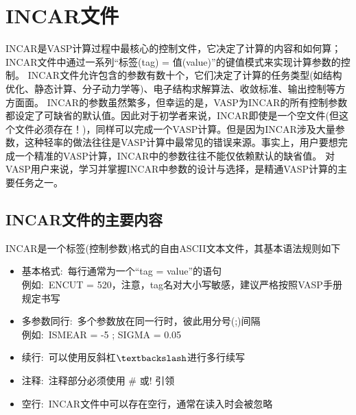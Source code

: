 \section{\rm{INCAR}文件}
\textrm{INCAR}是\textrm{VASP}计算过程中最核心的控制文件，它决定了计算的内容和如何算；\textrm{INCAR}文件中通过一系列``标签\textrm{(tag)} = 值\textrm{(value)}''的键值模式来实现计算参数的控制。
\textrm{INCAR}文件允许包含的参数有数十个，它们决定了计算的任务类型(如结构优化、静态计算、分子动力学等)、电子结构求解算法、收敛标准、输出控制等方方面面。
\textrm{INCAR}的参数虽然繁多，但幸运的是，\textrm{VASP}为\textrm{INCAR}的所有控制参数都设定了可缺省的默认值。因此对于初学者来说，\textrm{INCAR}即使是一个空文件(但这个文件必须存在！)，同样可以完成一个\textrm{VASP}计算。但是因为\textrm{INCAR}涉及大量参数，这种轻率的做法往往是\textrm{VASP}计算中最常见的错误来源。事实上，用户要想完成一个精准的\textrm{VASP}计算，\textrm{INCAR}中的参数往往不能仅依赖默认的缺省值。
对\textrm{VASP}用户来说，学习并掌握\textrm{INCAR}中参数的设计与选择，是精通\textrm{VASP}计算的主要任务之一。

\subsection{\rm{INCAR}文件的主要内容}
\textrm{INCAR}是一个标签(控制参数)格式的自由\textrm{ASCII}文本文件，其基本语法规则如下
\begin{itemize}
	\item 基本格式:~每行通常为一个``\textrm{tag} = \textrm{value}''的语句\\
		例如:~\textrm{ENCUT = 520}，注意，\textrm{tag}名对大小写敏感，建议严格按照\textrm{VASP}手册规定书写
	\item 多参数同行:~多个参数放在同一行时，彼此用分号\textrm{(;)}间隔\\
		例如:~\textrm{ISMEAR = -5 ; SIGMA = 0.05}
	\item 续行:~可以使用反斜杠\textrm{$\textbackslash$}进行多行续写
	\item 注释:~注释部分必须使用 \# 或! 引领
	\item 空行:~\textrm{INCAR}文件中可以存在空行，通常在读入时会被忽略
\end{itemize}

